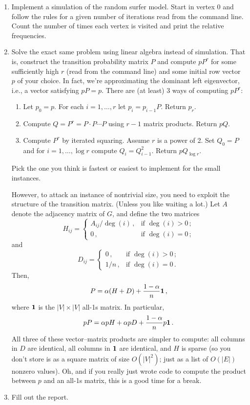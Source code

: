 \documentclass{tufte-handout}
\begin{document}
\begin{enumerate}
\item Implement a simulation of the random surfer model. 
  Start in
  vertex 0 and follow the rules for a given number of iterations read
  from the command line. Count the number of times each vertex is
  visited and print the relative frequencies.
\item Solve the exact same problem using linear algebra instead of
  simulation.
  That is, construct the transition probability matrix $P$ and
  compute $pP^r$ for some sufficiently high $r$ (read from the command
  line) and some initial row vector $p$ of your choice.
  In fact, we're approximating the dominant left eigenvector, i.e., a
  vector satisfying $pP= p$.
  There are (at least) 3 ways of computing $pP^r$:
  \begin{enumerate} 
  \item Let $p_0= p$. For each $i=1,\ldots, r$ let $p_i = p_{i-1}
    P$. Return $p_r$.
  \item Compute $Q = P^r = P\cdot P \cdots P$ using $r-1$ matrix products.
    Return $pQ$.
  \item Compute $P^r$ by iterated squaring. Assume $r$ is a power of
    2. Set $Q_0 = P$ and for $i=1,\ldots,\log r$ compute $Q_i =
    Q_{i-1}^2$. Return $pQ_{\log r}$. 
  \end{enumerate}
  Pick the one you think is fastest or easiest to implement for the
  small instances.

  However, to attack an instance of nontrivial size, you need to
  exploit the structure of the transition matrix.
  (Unless you like waiting a lot.)
  Let $A$ denote the adjacency matrix of $G$, and define the two
  matrices
  \[
  H_{ij} =
  \begin{cases}
    A_{ij} / \deg(i)\,, & \text{if } \deg(i) > 0\,; \\
    0\,, & \text{if } \deg(i) = 0 \,;   
  \end{cases}
  \]
  and
  \[
  D_{ij} =
  \begin{cases}
    0\,, & \text{if } \deg(i) > 0\,; \\
    1 / n\,, & \text{if } \deg(i) = 0\,.
  \end{cases}
  \]
  Then,
  \[ P = \alpha(H + D) + \frac{1-\alpha}{n} \bf 1\,,\]
  where $\bf 1$ is the $|V|\times |V|$ all-1s matrix.
  In particular,
  \[pP = \alpha p H + \alpha p D + \frac{1-\alpha}{n} p \bf 1\,.\] All
  three of these vector--matrix products are simpler to compute: all
  columns in $D$ are identical, all columns in $\bf 1$ are identical,
  and $H$ is sparse (so you don't store is as a square matrix of size
  $O(|V|^2)$; just as a list of $O(|E|)$ nonzero values).
  Oh, and if you really just wrote code to compute the product
  between $p$ and an all-1s matrix, this is a good time for a break.
\item Fill out the report.
\end{enumerate}
\end{document}
